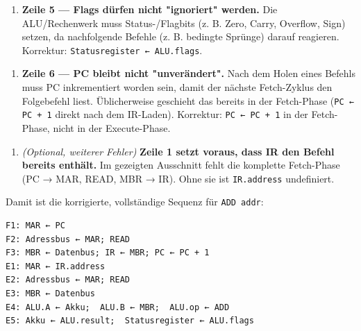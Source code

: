 \documentclass[11pt, a4paper]{article}
\begin{document}
\begin{enumerate}
  \item \textbf{Zeile 5 — Flags dürfen nicht "ignoriert" werden.} Die ALU/Rechenwerk muss Status-/Flagbits (z. B. Zero, Carry, Overflow, Sign) setzen, da nachfolgende Befehle (z. B. bedingte Sprünge) darauf reagieren. Korrektur: \texttt{Statusregister ← ALU.flags}.
\end{enumerate}

\begin{enumerate}
  \item \textbf{Zeile 6 — PC bleibt nicht "unverändert".} Nach dem Holen eines Befehls muss PC inkrementiert worden sein, damit der nächste Fetch-Zyklus den Folgebefehl liest. Üblicherweise geschieht das bereits in der Fetch-Phase (\texttt{PC ← PC + 1} direkt nach dem IR-Laden). Korrektur: \texttt{PC ← PC + 1} in der Fetch-Phase, nicht in der Execute-Phase.
\end{enumerate}

\begin{enumerate}
  \item \textit{(Optional, weiterer Fehler)} \textbf{Zeile 1 setzt voraus, dass IR den Befehl bereits enthält.} Im gezeigten Ausschnitt fehlt die komplette Fetch-Phase (PC → MAR, READ, MBR → IR). Ohne sie ist \texttt{IR.address} undefiniert.
\end{enumerate}

Damit ist die korrigierte, vollständige Sequenz für \texttt{ADD addr}:

\begin{lstlisting}
F1: MAR ← PC
F2: Adressbus ← MAR; READ
F3: MBR ← Datenbus; IR ← MBR; PC ← PC + 1
E1: MAR ← IR.address
E2: Adressbus ← MAR; READ
E3: MBR ← Datenbus
E4: ALU.A ← Akku;  ALU.B ← MBR;  ALU.op ← ADD
E5: Akku ← ALU.result;  Statusregister ← ALU.flags
\end{lstlisting}





\end{document}
